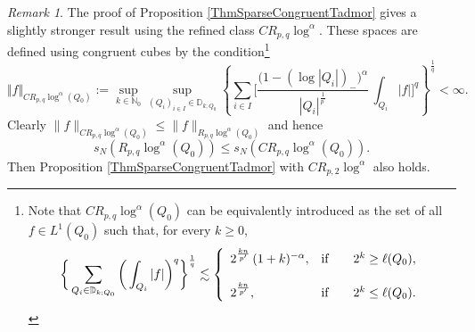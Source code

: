 \documentclass[11pt, a4paper,leqno]{amsart}
\theoremstyle{plain}
\numberwithin{equation}{section}
\theoremstyle{definition}
\theoremstyle{remark}
\newtheorem{remark}{Remark}
\begin{document}
\begin{remark}
	The proof of Proposition \ref{ThmSparseCongruentTadmor} gives a slightly stronger result using the refined class $CR_{p, q} \log^\alpha$. These spaces are defined using
congruent cubes by the condition\footnote{Note that $CR_{p,q}\log^{\alpha
}(Q_{0})$ can be equivalently introduced as the set of all $f\in L^{1}(Q_{0})$
such that, for every $k\geq0$,
\[
\bigg\{\sum_{Q_{i}\in\mathbb{D}_{k;Q_{0}}}\bigg(\int_{Q_{i}}|f|\bigg)^{q}%
\bigg\}^{\frac{1}{q}}\lesssim\left\{
\begin{array}
[c]{ll}%
2^{\frac{kn}{p^{\prime}}}\,(1+k)^{-\alpha}, & \text{if}\qquad2^{k}\geq
\ell(Q_{0}),\\
& \\
2^{\frac{kn}{p^{\prime}}}, & \text{if}\qquad2^{k}\leq\ell(Q_{0}).
\end{array}
\right.
\]
}
\[
\Vert f\Vert_{CR_{p,q}\log^{\alpha}(Q_{0})}:=\sup_{k\in\mathbb{N}_{0}}%
\sup_{(Q_{i})_{i\in I}\in\mathbb{D}_{k;Q_{0}}}\left\{\sum_{i\in I}%
\bigg[\frac{\big(1-(\log|Q_{i}|)_{-}\big)^{\alpha}}{|Q_{i}|^{\frac
{1}{p^{\prime}}}}\,\int_{Q_{i}}|f|\bigg]^{q}\right\}^{\frac{1}{q}}<\infty.
\]
Clearly $\|f\|_{CR_{p,q}\log^{\alpha}(Q_{0})} \leq \|f\|_{R_{p,q}\log^{\alpha}(Q_{0})}$ and hence $$s_N(R_{p,q}\log^{\alpha}(Q_{0})) \leq s_N(CR_{p,q}\log^{\alpha}(Q_{0})).$$
Then Proposition \ref{ThmSparseCongruentTadmor} with $CR_{p, 2} \log^\alpha$ also holds.  
\end{remark}

%
\end{document}
